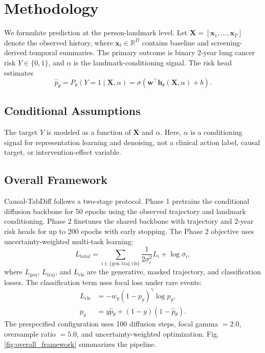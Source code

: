 \documentclass[11pt,journal,twoside]{IEEEtran}
\begin{document}
\section{Methodology}
\label{sec:methodology}

We formulate prediction at the person-landmark level. Let $\mathbf{X} = [\mathbf{x}_1,\dots,\mathbf{x}_T]$ denote the observed history, where $\mathbf{x}_t \in \mathbb{R}^{D}$ contains baseline and screening-derived temporal summaries. The primary outcome is binary 2-year lung cancer risk $Y \in \{0,1\}$, and $\alpha$ is the landmark-conditioning signal. The risk head estimates
\begin{equation}
\hat{p}_{\theta}=P_{\theta}(Y=1\mid \mathbf{X},\alpha)
=\sigma(\mathbf{w}^{\top}\mathbf{h}_{\theta}(\mathbf{X},\alpha)+b).
\label{eq:risk_readout}
\end{equation}

\subsection{Conditional Assumptions}
\label{subsec:problem_formulation}

The target $Y$ is modeled as a function of $\mathbf{X}$ and $\alpha$. Here, $\alpha$ is a conditioning signal for representation learning and denoising, not a clinical action label, causal target, or intervention-effect variable.

\subsection{Overall Framework}
\label{subsec:overall_framework}

Causal-TabDiff follows a two-stage protocol. Phase 1 pretrains the conditional diffusion backbone for 50 epochs using the observed trajectory and landmark conditioning. Phase 2 finetunes the shared backbone with trajectory and 2-year risk heads for up to 200 epochs with early stopping. The Phase 2 objective uses uncertainty-weighted multi-task learning:
\begin{equation}
L_{\text{total}} = \sum_{i \in \{\text{gen}, \text{traj}, \text{cls}\}} \frac{1}{2\sigma_i^2} L_i + \log \sigma_i ,
\label{eq:uw_loss}
\end{equation}
where $L_{\text{gen}}$, $L_{\text{traj}}$, and $L_{\text{cls}}$ are the generative, masked trajectory, and classification losses. The classification term uses focal loss under rare events:
\begin{equation}
\begin{aligned}
L_{\text{cls}}&=-w_y(1-p_y)^{\gamma}\log p_y,\\
p_y&=y\hat{p}_{\theta}+(1-y)(1-\hat{p}_{\theta}).
\end{aligned}
\label{eq:focal_loss}
\end{equation}
The prespecified configuration uses 100 diffusion steps, focal gamma $=2.0$, oversample ratio $=5.0$, and uncertainty-weighted optimization. Fig. \ref{fig:overall_framework} summarizes the pipeline.
\end{document}
